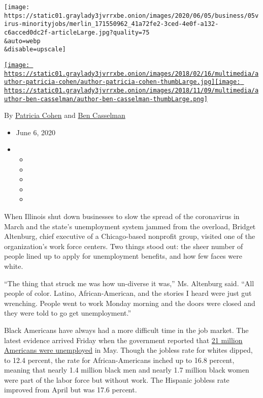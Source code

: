 \texttt{[image: https://static01.graylady3jvrrxbe.onion/images/2020/06/05/business/05virus-minorityjobs/merlin\_171550962\_41a72fe2-3ced-4e0f-a132-c6acced0dc2f-articleLarge.jpg?quality=75\\\&auto=webp\\\&disable=upscale]}

\href{https://www.nytimes3xbfgragh.onion/by/patricia-cohen}{\texttt{[image: https://static01.graylady3jvrrxbe.onion/images/2018/02/16/multimedia/author-patricia-cohen/author-patricia-cohen-thumbLarge.jpg]}}\href{https://www.nytimes3xbfgragh.onion/by/ben-casselman}{\texttt{[image: https://static01.graylady3jvrrxbe.onion/images/2018/11/09/multimedia/author-ben-casselman/author-ben-casselman-thumbLarge.png]}}

By \href{https://www.nytimes3xbfgragh.onion/by/patricia-cohen}{Patricia
Cohen} and
\href{https://www.nytimes3xbfgragh.onion/by/ben-casselman}{Ben
Casselman}

\begin{itemize}
\item
  June 6, 2020
\item
  \begin{itemize}
  \item
  \item
  \item
  \item
  \item
  \end{itemize}
\end{itemize}

When Illinois shut down businesses to slow the spread of the coronavirus
in March and the state's unemployment system jammed from the overload,
Bridget Altenburg, chief executive of a Chicago-based nonprofit group,
visited one of the organization's work force centers. Two things stood
out: the sheer number of people lined up to apply for unemployment
benefits, and how few faces were white.

``The thing that struck me was how un-diverse it was,'' Ms. Altenburg
said. ``All people of color. Latino, African-American, and the stories I
heard were just gut wrenching. People went to work Monday morning and
the doors were closed and they were told to go get unemployment.''

Black Americans have always had a more difficult time in the job market.
The latest evidence arrived Friday when the government reported that
\href{https://www.nytimes3xbfgragh.onion/2020/06/05/business/economy/jobs-report.html}{21
million Americans were unemployed} in May. Though the jobless rate for
whites dipped, to 12.4 percent, the rate for African-Americans inched up
to 16.8 percent, meaning that nearly 1.4 million black men and nearly
1.7 million black women were part of the labor force but without work.
The Hispanic jobless rate improved from April but was 17.6 percent.

